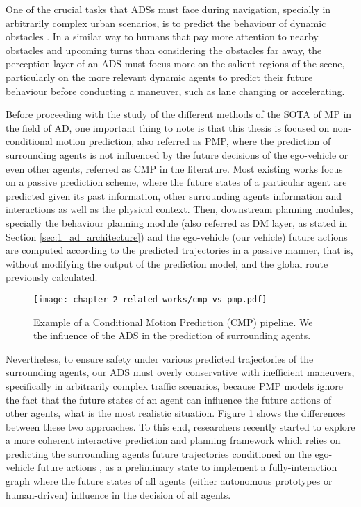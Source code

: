 One of the crucial tasks that \acp{ADS} must face during navigation, specially in arbitrarily complex urban scenarios, is to predict the behaviour of dynamic obstacles \cite{chang2019argoverse, salzmann2020trajectron++}. In a similar way to humans that pay more attention to nearby obstacles and upcoming turns than considering the obstacles far away, the perception layer of an \ac{ADS} must focus more on the salient regions of the scene, particularly on the more relevant dynamic agents to predict their future behaviour before conducting a maneuver, such as lane changing or accelerating. 

Before proceeding with the study of the different methods of the \ac{SOTA} of \ac{MP} in the field of \ac{AD}, one important thing to note is that this thesis is focused on non-conditional motion prediction, also referred as \ac{PMP}, where the prediction of surrounding agents is not influenced by the future decisions of the ego-vehicle or even other agents, referred as \ac{CMP} in the literature. Most existing works \cite{gilles2021home, gilles2022gohome, varadarajan2022multipath++, wang2022ganet, schmidt2022crat, liang2020learning} focus on a passive prediction scheme, where the future states of a particular agent are predicted given its past information, other surrounding agents information and interactions as well as the physical context. Then, downstream planning modules, specially the behaviour planning module (also referred as \ac{DM} layer, as stated in Section \ref{sec:1_ad_architecture}) and the ego-vehicle (our vehicle) future actions are computed according to the predicted trajectories in a passive manner, that is, without modifying the output of the prediction model, and the global route previously calculated. 

\begin{figure}[h]
	\centering
	\texttt{[image: chapter\_2\_related\_works/cmp\_vs\_pmp.pdf]}
	\caption[Example of a Conditional Motion Prediction (CMP) pipeline]{Example of a Conditional Motion Prediction (CMP) pipeline. We \textbf{\color{red}{highlight}} the influence of the \ac{ADS} in the prediction of surrounding agents.}
	\label{fig:chapter_2_related_works/cmp_vs_pmp}
\end{figure}

Nevertheless, to ensure safety under various predicted trajectories of the surrounding agents, our \ac{ADS} must overly conservative with inefficient maneuvers, specifically in arbitrarily complex traffic scenarios, because \ac{PMP} models ignore the fact that the future states of an agent can influence the future actions of other agents, what is the most realistic situation. Figure \ref{fig:chapter_2_related_works/cmp_vs_pmp} shows the differences between these two approaches. To this end, researchers recently started to explore a more coherent interactive prediction and planning framework which relies on predicting the surrounding agents future trajectories conditioned on the ego-vehicle future actions \cite{tang2019multiple} \cite{rhinehart2019precog} \cite{khandelwal2020if}, as a preliminary state to implement a fully-interaction graph where the future states of all agents (either autonomous prototypes or human-driven) influence in the decision of all agents. 

